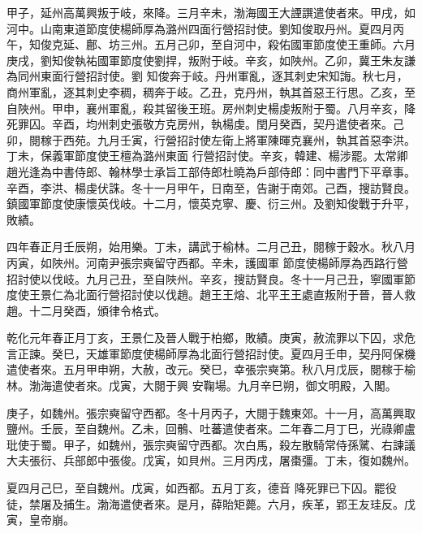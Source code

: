 \begin{pinyinscope}
 甲子，延州高萬興叛于岐，來降。三月辛未，渤海國王大諲譔遣使者來。甲戌，如河中。山南東道節度使楊師厚為潞州四面行營招討使。劉知俊取丹州。夏四月丙午，知俊克延、鄜、坊三州。五月己卯，至自河中，殺佑國軍節度使王重師。六月庚戌，劉知俊執祐國軍節度使劉捍，叛附于岐。辛亥，如陜州。乙卯，冀王朱友謙為同州東面行營招討使。劉
 知俊奔于岐。丹州軍亂，逐其刺史宋知誨。秋七月，商州軍亂，逐其刺史李稠，稠奔于岐。乙丑，克丹州，執其首惡王行思。乙亥，至自陜州。甲申，襄州軍亂，殺其留後王班。房州刺史楊虔叛附于蜀。八月辛亥，降死罪囚。辛酉，均州刺史張敬方克房州，執楊虔。閏月癸酉，契丹遣使者來。己卯，閱稼于西苑。九月壬寅，行營招討使左衛上將軍陳暉克襄州，執其首惡李洪。丁未，保義軍節度使王檀為潞州東面
 行營招討使。辛亥，韓建、楊涉罷。太常卿趙光逢為中書侍郎、翰林學士承旨工部侍郎杜曉為戶部侍郎：同中書門下平章事。辛酉，李洪、楊虔伏誅。冬十一月甲午，日南至，告謝于南郊。己酉，搜訪賢良。鎮國軍節度使康懷英伐岐。十二月，懷英克寧、慶、衍三州。及劉知俊戰于升平，敗績。



 四年春正月壬辰朔，始用樂。丁未，講武于榆林。二月己丑，閱稼于穀水。秋八月丙寅，如陜州。河南尹張宗奭留守西都。辛未，護國軍
 節度使楊師厚為西路行營招討使以伐岐。九月己丑，至自陜州。辛亥，搜訪賢良。冬十一月己丑，寧國軍節度使王景仁為北面行營招討使以伐趙。趙王王熔、北平王王處直叛附于晉，晉人救趙。十二月癸酉，頒律令格式。



 乾化元年春正月丁亥，王景仁及晉人戰于柏鄉，敗績。庚寅，赦流罪以下囚，求危言正諫。癸巳，天雄軍節度使楊師厚為北面行營招討使。夏四月壬申，契丹阿保機遣使者來。五月甲申朔，大赦，改元。癸巳，幸張宗奭第。秋八月戊辰，閱稼于榆林。渤海遣使者來。戊寅，大閱于興
 安鞠場。九月辛巳朔，御文明殿，入閣。



 庚子，如魏州。張宗奭留守西都。冬十月丙子，大閱于魏東郊。十一月，高萬興取鹽州。壬辰，至自魏州。乙未，回鶻、吐蕃遣使者來。二年春二月丁巳，光祿卿盧玭使于蜀。甲子，如魏州，張宗奭留守西都。次白馬，殺左散騎常侍孫騭、右諫議大夫張衍、兵部郎中張俊。戊寅，如貝州。三月丙戌，屠棗彊。丁未，復如魏州。



 夏四月己巳，至自魏州。戊寅，如西都。五月丁亥，德音
 降死罪已下囚。罷役徒，禁屠及捕生。渤海遣使者來。是月，薛貽矩薨。六月，疾革，郢王友珪反。戊寅，皇帝崩。




\end{pinyinscope}
